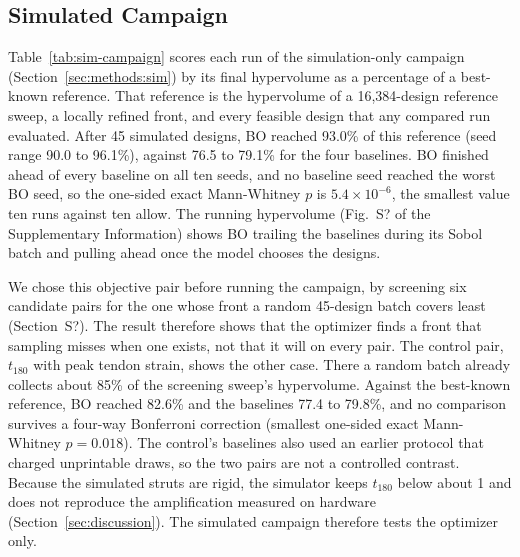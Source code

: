 \documentclass[11pt]{article}
\providecommand{\siref}[1]{S?}
\begin{document}
\subsection{Simulated Campaign}
\label{sec:results:sim}

Table~\ref{tab:sim-campaign} scores each run of the simulation-only
campaign (Section~\ref{sec:methods:sim}) by its final hypervolume as a
percentage of a best-known reference. That reference is the
hypervolume of a 16,384-design reference sweep, a locally refined
front, and every feasible design that any compared run evaluated. After 45 simulated
designs, BO reached 93.0\% of this reference (seed range 90.0 to
96.1\%), against 76.5 to 79.1\% for the four baselines. BO finished
ahead of every baseline on all ten seeds, and no baseline seed reached
the worst BO seed, so the one-sided exact Mann-Whitney $p$ is
$5.4\times10^{-6}$, the smallest value ten runs against ten allow. The
running hypervolume (Fig.~\siref{fig:si-sim-campaign} of the
Supplementary Information) shows BO trailing the baselines during its
Sobol batch and pulling ahead once the model chooses the designs.

We chose this objective pair before running the campaign, by screening
six candidate pairs for the one whose front a random 45-design batch
covers least (Section~\siref{si:sim-campaign}). The result therefore
shows that the optimizer finds a front that sampling misses when one
exists, not that it will on every pair. The control pair, $t_{180}$
with peak tendon strain, shows the other case. There a random batch
already collects about 85\% of the screening sweep's hypervolume.
Against the best-known reference, BO reached 82.6\% and the baselines
77.4 to 79.8\%, and no comparison survives a four-way
Bonferroni correction (smallest one-sided exact Mann-Whitney $p = 0.018$). The control's
baselines also used an earlier protocol that charged unprintable
draws, so the two pairs are not a controlled contrast. Because the
simulated struts are rigid, the simulator keeps $t_{180}$ below about 1
and does not reproduce the amplification measured on hardware
(Section~\ref{sec:discussion}). The simulated campaign therefore tests
the optimizer only.

\begin{table}[!tbp]
  \centering
  \caption{Simulation-only campaign: final hypervolume after 45
    designs as a percentage of each objective pair's best-known
    reference (mean $\pm$ sample standard deviation over ten seeds).
    $p$ is the $p$-value of the one-sided exact Mann-Whitney test that BO exceeds the
    baseline, and Wins counts the seeds on which BO finished ahead of
    the baseline run with the same seed index. LHS is Latin hypercube
    sampling. The envelope-pair baselines skip unprintable candidates
    without simulating them, and the strain control used the earlier
    protocol that charged them.}%
  \label{tab:sim-campaign}
  \footnotesize
  \setlength{\tabcolsep}{3.5pt}
  
\end{table}
\end{document}
